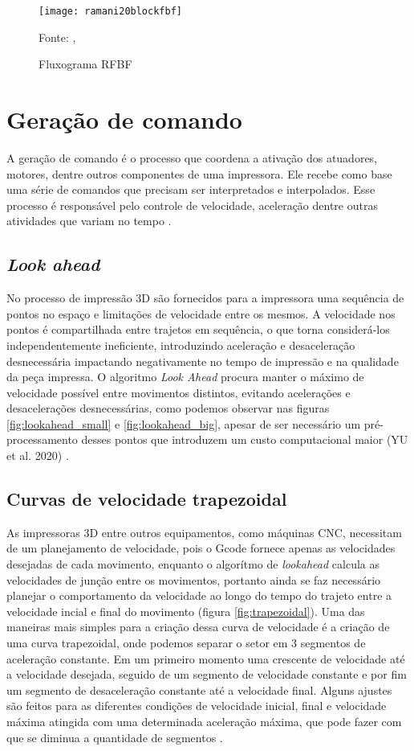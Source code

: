 \begin{figure}[!htb]
    \centering
    \caption{Fluxograma RFBF}
    \texttt{[image: ramani20blockfbf]}

    {\footnotesize Fonte: \citeauthor{ramani20}, \citeyear{ramani20}}
    \label{fig:flowchart_rfbf}
\end{figure}

\section{Geração de comando}
A geração de comando é o processo que coordena a ativação dos 
atuadores, motores, dentre outros componentes de uma impressora. 
Ele recebe como base uma série de comandos que precisam ser 
interpretados e interpolados. Esse processo é responsável pelo 
controle de velocidade, aceleração dentre outras atividades que 
variam no tempo \cite{yu20}. 

\subsection{\textit{Look ahead}}
No processo de impressão 3D são fornecidos para a impressora 
uma sequência de pontos no espaço e limitações de velocidade 
entre os mesmos. A velocidade nos pontos é compartilhada entre 
trajetos em sequência, o que torna considerá-los 
independentemente ineficiente, introduzindo aceleração e 
desaceleração desnecessária impactando negativamente no tempo 
de impressão e na qualidade da peça impressa.
O algoritmo \textit{Look Ahead} procura manter o máximo de velocidade 
possível entre movimentos distintos, evitando acelerações e 
desacelerações desnecessárias, como podemos observar nas figuras 
\ref{fig:lookahead_small} e \ref{fig:lookahead_big}, 
apesar de ser necessário um 
pré-processamento desses pontos que introduzem um custo 
computacional maior (YU et al. 2020) \cite{yu20, klipperkinematic}.

\subsection{Curvas de velocidade trapezoidal}
As impressoras 3D entre outros equipamentos, como máquinas CNC, necessitam
de um planejamento de velocidade, pois o Gcode fornece apenas as velocidades desejadas
de cada movimento, enquanto o algorítmo de \textit{lookahead} calcula as velocidades
de junção entre os movimentos, portanto ainda se faz necessário planejar
o comportamento da velocidade ao longo do tempo do trajeto entre a velocidade incial
e final do movimento (figura \ref{fig:trapezoidal}).
Uma das maneiras mais simples para a criação dessa curva de velocidade é
a criação de uma curva trapezoidal, onde podemos separar o setor em 3 segmentos
de aceleração constante. Em um primeiro momento uma crescente de velocidade até
a velocidade desejada, seguido de um segmento de velocidade constante e por fim
um segmento de desaceleração constante até a velocidade final.
Alguns ajustes são feitos para as diferentes condições de velocidade inicial, final e
velocidade máxima atingida com uma determinada aceleração máxima, que pode
fazer com que se diminua a quantidade de segmentos \cite{yu20,klipperkinematic}.

